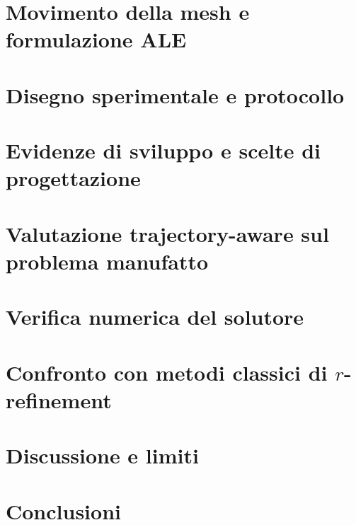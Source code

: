 \documentclass[10pt,a4paper,twocolumn]{article}
\begin{document}
\section{Movimento della mesh e formulazione ALE}\label{sec:ale}


\section{Disegno sperimentale e protocollo}\label{sec:protocollo}


\section{Evidenze di sviluppo e scelte di progettazione}\label{sec:stageabc}


\section{Valutazione trajectory-aware sul problema manufatto}\label{sec:staged}


\section{Verifica numerica del solutore}\label{sec:stagee}


\section{Confronto con metodi classici di \texorpdfstring{$r$-refinement}{r-refinement}}\label{sec:stagef}


\section{Discussione e limiti}\label{sec:discussione}


\section{Conclusioni}\label{sec:conclusioni}



\renewcommand{\refname}{Bibliografia}
\setlength{\bibsep}{0.2pt}
\begingroup\fontsize{8.0}{8.45}\selectfont

\endgroup

\clearpage
\appendix
\small
\setlength{\textfloatsep}{4pt plus 1pt minus 1pt}
\setlength{\floatsep}{3pt plus 1pt minus 1pt}
\setlength{\intextsep}{3pt plus 1pt minus 1pt}




\end{document}
